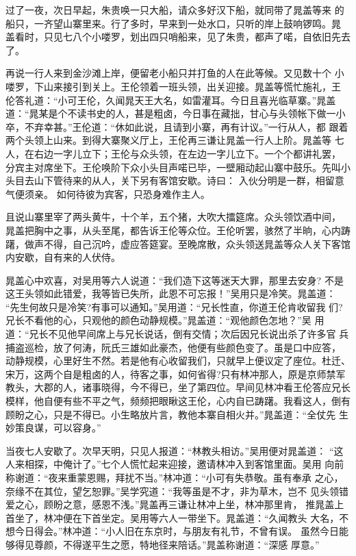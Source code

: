 过了一夜，次日早起，朱贵唤一只大船，请众多好汉下船，就同带了晁盖等来
的船只，一齐望山寨里来。行了多时，早来到一处水口，只听的岸上鼓响锣鸣。晁
盖看时，只见七八个小喽罗，划出四只哨船来，见了朱贵，都声了喏，自依旧先去
了。

再说一行人来到金沙滩上岸，便留老小船只并打鱼的人在此等候。又见数十个
小喽罗，下山来接引到关上。王伦领着一班头领，出关迎接。晁盖等慌忙施礼，王
伦答礼道：“小可王伦，久闻晁天王大名，如雷灌耳。今日且喜光临草寨。”晁盖
道：“晁某是个不读书史的人，甚是粗卤，今日事在藏拙，甘心与头领帐下做一小
卒，不弃幸甚。”王伦道：“休如此说，且请到小寨，再有计议。”一行从人，都
跟着两个头领上山来。到得大寨聚义厅上，王伦再三谦让晁盖一行人上阶。晁盖等
七人，在右边一字儿立下；王伦与众头领，在左边一字儿立下。一个个都讲礼罢，
分宾主对席坐下。王伦唤阶下众小头目声喏已毕，一壁厢动起山寨中鼓乐。先叫小
头目去山下管待来的从人，关下另有客馆安歇。诗曰：
入伙分明是一群，相留意气便须亲。
如何待彼为宾客，只恐身难作主人。

且说山寨里宰了两头黄牛，十个羊，五个猪，大吹大擂筵席。众头领饮酒中间，
晁盖把胸中之事，从头至尾，都告诉王伦等众位。王伦听罢，骇然了半晌，心内踌
躇，做声不得，自己沉吟，虚应答筵宴。至晚席散，众头领送晁盖等众人关下客馆
内安歇，自有来的人伏侍。

晁盖心中欢喜，对吴用等六人说道：“我们造下这等迷天大罪，那里去安身?
不是这王头领如此错爱，我等皆已失所，此恩不可忘报！”吴用只是冷笑。晁盖道：
“先生何故只是冷笑?有事可以通知。”吴用道：“兄长性直，你道王伦肯收留我
们?兄长不看他的心，只观他的颜色动静规模。”晁盖道：“观他颜色怎地？”吴
用道：“兄长不见他早间席上与兄长说话，倒有交情；次后因兄长说出杀了许多官
兵捕盗巡检，放了何涛，阮氏三雄如此豪杰，他便有些颜色变了。虽是口中应答，
动静规模，心里好生不然。若是他有心收留我们，只就早上便议定了座位。杜迁、
宋万，这两个自是粗卤的人，待客之事，如何省得?只有林冲那人，原是京师禁军
教头，大郡的人，诸事晓得，今不得已，坐了第四位。早间见林冲看王伦答应兄长
模样，他自便有些不平之气，频频把眼瞅这王伦，心内自已踌躇。我看这人，倒有
顾盼之心，只是不得已。小生略放片言，教他本寨自相火并。”晁盖道：“全仗先
生妙策良谋，可以容身。”

当夜七人安歇了。次早天明，只见人报道：“林教头相访。”吴用便对晁盖道：
“这人来相探，中俺计了。”七个人慌忙起来迎接，邀请林冲入到客馆里面。吴用
向前称谢道：“夜来重蒙恩赐，拜扰不当。”林冲道：“小可有失恭敬。虽有奉承
之心，奈缘不在其位，望乞恕罪。”吴学究道：“我等虽是不才，非为草木，岂不
见头领错爱之心，顾盼之意，感恩不浅。”晁盖再三谦让林冲上坐，林冲那里肯，
推晁盖上首坐了，林冲便在下首坐定。吴用等六人一带坐下。晁盖道：“久闻教头
大名，不想今日得会。”林冲道：“小人旧在东京时，与朋友有礼节，不曾有误。
虽然今日能够得见尊颜，不得遂平生之愿，特地径来陪话。”晁盖称谢道：“深感
厚意。”

